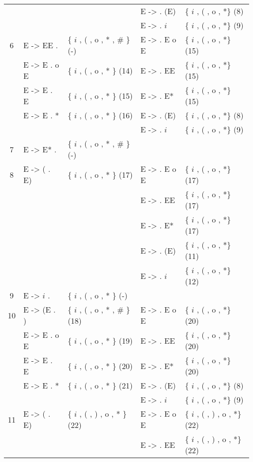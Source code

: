 \begin{center}
\begin{longtable}{c|ll|ll}
 &              &                & E ->  . (E) & \{ $i$ , ( , o , *\} (8)\\
 &              &                & E ->  . $i$   & \{ $i$ , ( , o , *\} (9)\\
\hline
6 &   E -> EE .   & \{ $i$ , ( , o , * , \# \} (-) & E ->  . E o E & \{ $i$ , ( , o , *\} (15)\\
 &   E -> E . o E & \{ $i$ , ( , o , *   \} (14) & E ->  . EE  & \{ $i$ , ( , o , *\} (15)\\
 &   E -> E . E  & \{ $i$ , ( , o , *   \} (15) & E ->  . E*  & \{ $i$ , ( , o , *\} (15)\\
 &   E -> E . *  & \{ $i$ , ( , o , *   \} (16) & E ->  . (E) & \{ $i$ , ( , o , *\} (8)\\
 &              &                & E ->  . $i$   & \{ $i$ , ( , o , *\} (9)\\
\hline
7 &   E -> E* .   & \{ $i$ , ( , o , * , \# \} (-)\\
\hline
8 &   E -> ( . E) & \{ $i$ , ( , o , *   \} (17) & E ->  . E o E & \{ $i$ , ( , o , *\} (17)\\
 &              &                & E ->  . EE  & \{ $i$ , ( , o , *\} (17)\\
 &              &                & E ->  . E*  & \{ $i$ , ( , o , *\} (17)\\
 &              &                & E ->  . (E) & \{ $i$ , ( , o , *\} (11)\\
 &              &                & E ->  . $i$   & \{ $i$ , ( , o , *\} (12)\\
 \hline
9 &   E -> $i$ .    & \{ $i$ , ( , o , *   \} (-)\\
\hline
10 &   E -> (E . ) & \{ $i$ , ( , o , * , \# \} (18) & E ->  . E o E & \{ $i$ , ( , o , *\} (20)\\
 &   E -> E . o E & \{ $i$ , ( , o , *   \} (19) & E ->  . EE  & \{ $i$ , ( , o , *\} (20)\\
 &   E -> E . E  & \{ $i$ , ( , o , *   \} (20) & E ->  . E*  & \{ $i$ , ( , o , *\} (20)\\
 &   E -> E . *  & \{ $i$ , ( , o , *   \} (21) & E ->  . (E) & \{ $i$ , ( , o , *\} (8)\\
 &              &                & E ->  . $i$   & \{ $i$ , ( , o , *\} (9)\\
\hline
11 &   E -> ( . E) & \{ $i$ , ( , ) , o , * \} (22) & E ->  . E o E & \{ $i$ , ( , ) , o , *\} (22)\\
 &              &                & E ->  . EE  & \{ $i$ , ( , ) , o , *\} (22)\\

\end{longtable}
\end{center}
